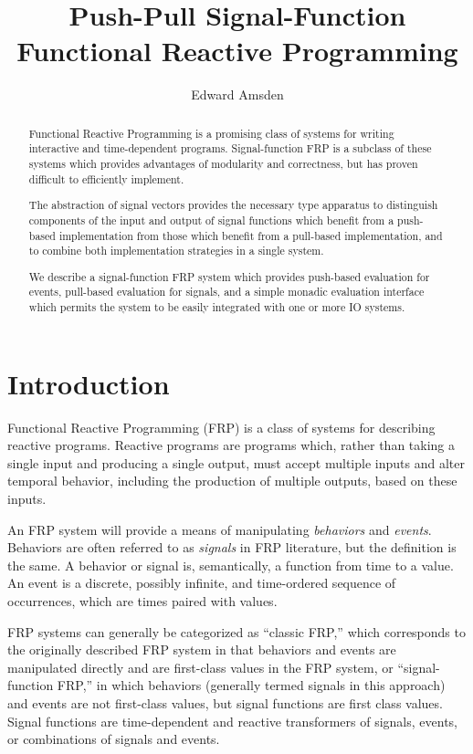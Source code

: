 \documentclass[draft]{llncs}
\title{Push-Pull Signal-Function Functional Reactive Programming}
\author{Edward Amsden}
\institute{Rochester Institute of Technology\\\email{eca7215@cs.rit.edu}}
\begin{document}
\maketitle

\begin{abstract}
Functional Reactive Programming is a promising class of systems for writing
interactive and time-dependent programs. Signal-function FRP is a subclass of
these systems which provides advantages of modularity and correctness, but
has proven difficult to efficiently implement.

The abstraction of signal vectors provides the necessary type apparatus to
distinguish components of the input and output of signal functions which benefit
from a push-based implementation from those which benefit from a pull-based
implementation, and to combine both implementation strategies in a single system.

We describe a signal-function FRP system which provides push-based evaluation
for events, pull-based evaluation for signals, and a simple monadic evaluation
interface which permits the system to be easily integrated with one or more
IO systems.
\end{abstract}

\section{Introduction}
\label{section:Introduction}

Functional Reactive Programming (FRP) is a class of systems for describing
reactive programs. Reactive programs are programs which, rather than taking
a single input and producing a single output, must accept multiple inputs and 
alter temporal behavior, including the production of multiple outputs, based
on these inputs.

An FRP system will provide a means of manipulating {\em behaviors} and
{\em events}. Behaviors are often referred to as {\em signals} in FRP literature,
but the definition is the same. A behavior or signal is, semantically, a
function from time to a value. An event is a discrete, possibly infinite, and 
time-ordered sequence of occurrences, which are times paired with values.

FRP systems can generally be categorized as ``classic FRP,'' 
which corresponds to the originally described FRP system in that behaviors
and events are manipulated directly and are first-class values in the FRP
system, or ``signal-function FRP,'' in which behaviors (generally termed
signals in this approach) and events are not first-class values, but signal
functions are first class values. Signal functions are time-dependent and
reactive transformers of signals, events, or combinations of signals and events.
\end{document}
